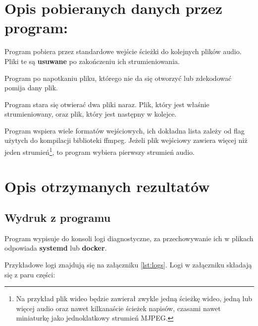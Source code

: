 \documentclass[a4paper,12pt]{article}
\begin{document}
\section{Opis pobieranych danych przez program:}

Program pobiera przez standardowe wejście ścieżki do kolejnych plików audio.
Pliki te są \textbf{usuwane} po zakończeniu ich strumieniowania.

Program po napotkaniu pliku, którego nie da się otworzyć lub zdekodować pomija
dany plik. 

Program stara się otwierać dwa pliki naraz. Plik, który jest właśnie
strumieniowany, oraz plik, który jest następny w kolejce.

Program wspiera wiele formatów wejściowych, ich dokładna lista zależy od flag
użytych do kompilacji biblioteki ffmpeg. Jeżeli plik wejściowy zawiera więcej
niż jeden strumień\footnote{Na przykład plik wideo będzie zawierał zwykle jedną
ścieżkę wideo, jedną lub więcej audio oraz nawet kilkanaście ścieżek napisów,
czasami nawet miniaturkę jako jednoklatkowy strumień MJPEG.}, to program wybiera
pierwszy strumień audio.

\section{Opis otrzymanych rezultatów}

\subsection*{Wydruk z programu}

Program wypisuje do konsoli logi diagnostyczne, za przechowywanie ich w plikach
odpowiada \textbf{systemd} lub \textbf{docker}.

Przykładowe logi znajdują się na załączniku \ref{lst:logs}. Logi w załączniku 
składają się z paru części:
\end{document}
